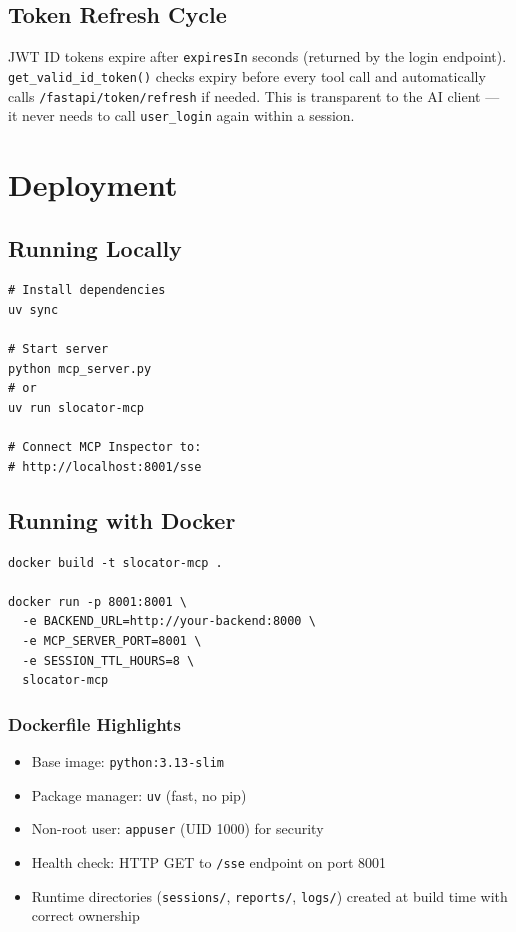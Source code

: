 \documentclass[12pt,a4paper]{report}
\begin{document}
\section{Token Refresh Cycle}

JWT ID tokens expire after \texttt{expiresIn} seconds (returned by the login
endpoint). \texttt{get\_valid\_id\_token()} checks expiry before every tool call
and automatically calls \texttt{/fastapi/token/refresh} if needed. This is
transparent to the AI client --- it never needs to call \texttt{user\_login} again
within a session.

\chapter{Deployment}

\section{Running Locally}

\begin{lstlisting}[language={},caption={Local startup}]
# Install dependencies
uv sync

# Start server
python mcp_server.py
# or
uv run slocator-mcp

# Connect MCP Inspector to:
# http://localhost:8001/sse
\end{lstlisting}

\section{Running with Docker}

\begin{lstlisting}[language={},caption={Docker build and run}]
docker build -t slocator-mcp .

docker run -p 8001:8001 \
  -e BACKEND_URL=http://your-backend:8000 \
  -e MCP_SERVER_PORT=8001 \
  -e SESSION_TTL_HOURS=8 \
  slocator-mcp
\end{lstlisting}

\subsection{Dockerfile Highlights}

\begin{itemize}[noitemsep]
  \item Base image: \texttt{python:3.13-slim}
  \item Package manager: \texttt{uv} (fast, no pip)
  \item Non-root user: \texttt{appuser} (UID 1000) for security
  \item Health check: HTTP GET to \texttt{/sse} endpoint on port 8001
  \item Runtime directories (\texttt{sessions/}, \texttt{reports/}, \texttt{logs/})
    created at build time with correct ownership
\end{itemize}
\end{document}
